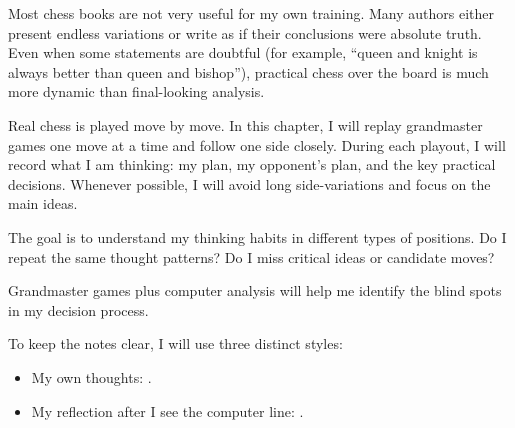 Most chess books are not very useful for my own training.  
Many authors either present endless variations or write as if their conclusions were absolute truth.  
Even when some statements are doubtful (for example, ``queen and knight is always better than queen and bishop''), practical chess over the board is much more dynamic than final-looking analysis.

Real chess is played move by move.  
In this chapter, I will replay grandmaster games one move at a time and follow one side closely.  
During each playout, I will record what I am thinking: my plan, my opponent's plan, and the key practical decisions.  
Whenever possible, I will avoid long side-variations and focus on the main ideas.

The goal is to understand my thinking habits in different types of positions.  
Do I repeat the same thought patterns?  
Do I miss critical ideas or candidate moves?

Grandmaster games plus computer analysis will help me identify the blind spots in my decision process.

To keep the notes clear, I will use three distinct styles:
\begin{itemize}
  \item My own thoughts: . 
  \item My reflection after I see the computer line: . 
\end{itemize}
